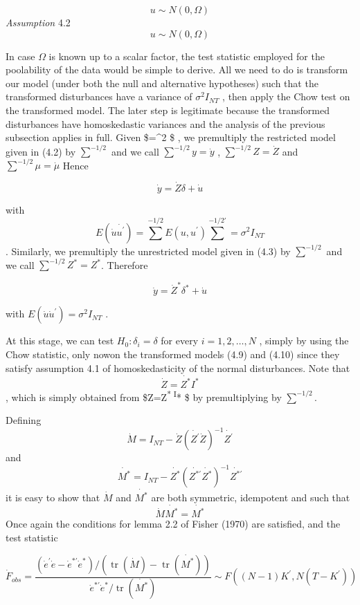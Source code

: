 \documentclass[
]{book}
\begin{document}
\[ u \sim N\left(0, \Omega\right)\]
\emph{Assumption} 4.2 \[ u \sim N\left(0, \Omega\right)\]

In case \(\Omega\) is known up to a scalar factor, the test statistic employed for the poolability of
the data would be simple to derive. All we need to do is transform our model (under both
the null and alternative hypotheses) such that the transformed disturbances have a variance of \(\sigma^2 I_{NT}\) , then apply the Chow test on the transformed model. The later step is legitimate because
the transformed disturbances have homoskedastic variances and the analysis of the previous
subsection applies in full. Given \$\Omega =\sigma\^{}2 \sum \$ , we premultiply the restricted model given in (4.2)
by \(\sum^{-1/2}\) and we call \(\sum^{-1/2}y=\dot{y}\) , \(\sum^{-1/2}Z=\dot{Z}\) and \(\sum^{-1/2} \mu=\dot{\mu}\) Hence

\begin{equation}
\dot{y}=\dot{Z}\delta + \dot{u}
\end{equation}

with \[E\left(\dot{u}\dot{u^{\prime}}\right) =\sum^{-1/2} E\left(u,u^{\prime}\right) \sum^{-1/2  \prime} =\sigma^2 I_{NT} \].
Similarly, we premultiply the unrestricted model
given in (4.3) by \(\sum^{-1/2}\) and we call \(\sum^{-1/2} Z^*=Z^*\).
Therefore

\begin{equation}
\dot{y}=\dot{Z}^{*} \delta ^{*} + \dot{u}
\end{equation}

with \(E\left(\dot{u}\dot{u}^{\prime}\right)=\sigma^2 I_{NT}\) .

At this stage, we can test \(H_0:\delta_i =\delta\) for every \(i=1,2,\ldots, N\) , simply by using the Chow statistic, only nowon the transformed models (4.9) and (4.10) since they satisfy assumption 4.1
of homoskedasticity of the normal disturbances. Note that \[\dot{Z}=\dot{Z^*}I^* \] , which is simply obtained
from \$Z=Z\textsuperscript{* I}* \$ by premultiplying by \(\sum^{-1/2}\).

Defining \[\dot{M}=I_{NT}-\dot{Z}\left(\dot{Z^{\prime}}\dot{Z} \right)^{-1} \dot{Z^{\prime}}   \] and \[\dot{M^*}=I_{NT}-\dot{Z^*}\left(\dot{Z^{* \prime}}\dot{Z^*} \right)^{-1} \dot{Z^{* \prime}}   \] it is easy to show that \(\dot{M}\) and \(\dot{M^*}\) are both symmetric, idempotent and such that \[\dot{M} \dot{M^*}=\dot{M^*}  \] Once again the conditions for lemma 2.2 of Fisher (1970) are satisfied, and the test statistic

\begin{equation}
\dot{F}_{obs}=\frac{\left(\dot{e}^{\prime} \dot{e}-\dot{e}^{* \prime}    \dot{e}^* \right)  /  \left(\operatorname{tr}\left(\dot{M}\right)-\operatorname{tr}\left(\dot{M^*}  \right) \right)  } 
{\dot{e}^{* \prime}    \dot{e}^* / \operatorname{tr}\left( \dot{M^*} \right) } 
\sim
F \left(\left( N-1 \right)K^{\prime} , N \left( T- K^{\prime} \right)          \right)
\end{equation}
\end{document}
